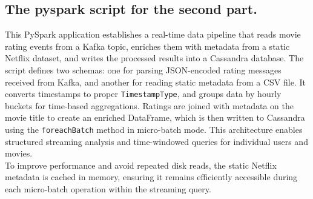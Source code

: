 \documentclass[a4paper,11pt]{article}
\theoremstyle{mytheor}
\begin{document}
\subsection*{The pyspark script for the second part.}
This PySpark application establishes a real-time data pipeline that reads movie rating events from a Kafka topic, enriches them with metadata from a static Netflix dataset, and writes the processed results into a Cassandra database. The script defines two schemas: one for parsing JSON-encoded rating messages received from Kafka, and another for reading static metadata from a CSV file. It converts timestamps to proper \texttt{TimestampType}, and groups data by hourly buckets for time-based aggregations. Ratings are joined with metadata on the movie title to create an enriched DataFrame, which is then written to Cassandra using the \texttt{foreachBatch} method in micro-batch mode. This architecture enables structured streaming analysis and time-windowed queries for individual users and movies.\\

To improve performance and avoid repeated disk reads, the static Netflix metadata is cached in memory, ensuring it remains efficiently accessible during each micro-batch operation within the streaming query.\\
\end{document}
